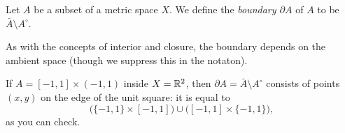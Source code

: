 \begin{definition}
  Let \(A\) be a subset of a metric space \(X\). We define the
  \emph{boundary \(\partial A\)} of \(A\) to be \(\bar A\setminus
  A^\circ\).
\end{definition}

As with the concepts of interior and closure, the boundary depends on the
ambient space (though we suppress this in the notaton).

\begin{example}
  If \(A=[-1,1]\times(-1,1)\) inside \(X=\mathbb{R}^2\), then \(\partial A=\bar
  A\setminus A^\circ\) consists of points \((x,y)\) on the edge of the unit
  square: it is equal to
  \[
    \bigl(\{-1,1\}\times[-1,1]\bigr)\cup
    \bigl([-1,1]\times\{-1,1\}\bigr),
  \]
  as you can check.
\end{example}

